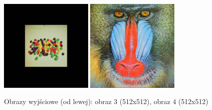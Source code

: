 \documentclass[final,a4paper,openany,12pt]{mwbk}
\begin{document}
\begin{figure}[H]
	\begin{center}
		\includegraphics[width=0.4\textwidth]{candy_color_unificationGeo_result}
		\includegraphics[width=0.4\textwidth]{mandrill_color_unificationGeo_result}
	\end{center}
	\caption{Obrazy wyjściowe (od lewej): obraz 3 (512x512), obraz 4 (512x512)}
\end{figure}

\end{document}
